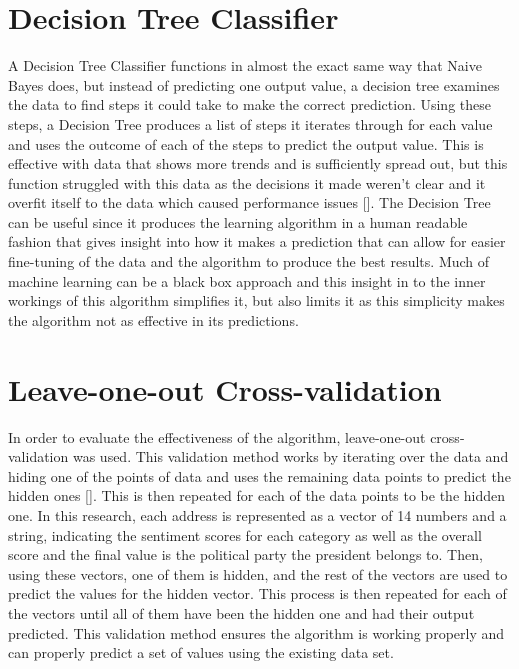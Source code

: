 \section{Decision Tree Classifier}
A Decision Tree Classifier functions in almost the exact same way that Naive Bayes does, but instead of predicting one output value, a decision tree examines the data to find steps it could take to make the correct prediction.
Using these steps, a Decision Tree produces a list of steps it iterates through for each value and uses the outcome of each of the steps to predict the output value.
This is effective with data that shows more trends and is sufficiently spread out, but this function struggled with this data as the decisions it made weren't clear and it overfit itself to the data which caused performance issues [\cite{dietterich1995overfitting}].
The Decision Tree can be useful since it produces the learning algorithm in a human readable fashion that gives insight into how it makes a prediction that can allow for easier fine-tuning of the data and the algorithm to produce the best results.
Much of machine learning can be a black box approach and this insight in to the inner workings of this algorithm simplifies it, but also limits it as this simplicity makes the algorithm not as effective in its predictions.

\section{Leave-one-out Cross-validation}
In order to evaluate the effectiveness of the algorithm, leave-one-out cross-validation was used.
This validation method works by iterating over the data and hiding one of the points of data and uses the remaining data points to predict the hidden ones [\cite{tzutsung2015validation}].
This is then repeated for each of the data points to be the hidden one.
In this research, each address is represented as a vector of 14 numbers and a string, indicating the sentiment scores for each category as well as the overall score and the final value is the political party the president belongs to.
Then, using these vectors, one of them is hidden, and the rest of the vectors are used to predict the values for the hidden vector.
This process is then repeated for each of the vectors until all of them have been the hidden one and had their output predicted.
This validation method ensures the algorithm is working properly and can properly predict a set of values using the existing data set.

